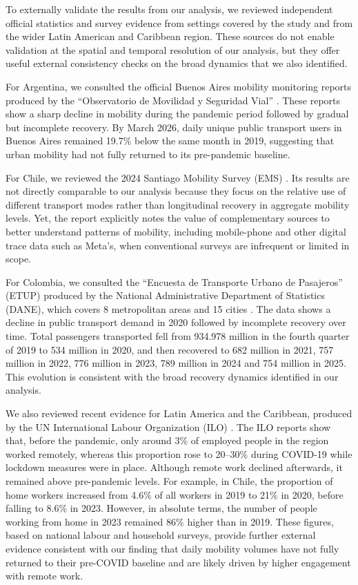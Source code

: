 \documentclass[fleqn,10pt]{wlscirep}
\begin{document}
To externally validate the results from our analysis, we reviewed independent official statistics and survey evidence from settings covered by the study and from the wider Latin American and Caribbean region. These sources do not enable validation at the spatial and temporal resolution of our analysis, but they offer useful external consistency checks on the broad dynamics that we also identified.

For Argentina, we consulted the official Buenos Aires mobility monitoring reports produced by the ``Observatorio de Movilidad y Seguridad Vial'' \cite{OMSV2026BA}. These reports show a sharp decline in mobility during the pandemic period followed by gradual but incomplete recovery. By March 2026, daily unique public transport users in Buenos Aires remained 19.7\% below the same month in 2019, suggesting that urban mobility had not fully returned to its pre-pandemic baseline.

For Chile, we reviewed the 2024 Santiago Mobility Survey (EMS) \cite{Hurtubia2024EMS}. Its results are not directly comparable to our analysis because they focus on the relative use of different transport modes rather than longitudinal recovery in aggregate mobility levels. Yet, the report explicitly notes the value of complementary sources to better understand patterns of mobility, including mobile-phone and other digital trace data such as Meta's, when conventional surveys are infrequent or limited in scope.

For Colombia, we consulted the ``Encuesta de Transporte Urbano de Pasajeros'' (ETUP) produced by the National Administrative Department of Statistics (DANE), which covers 8 metropolitan areas and 15 cities \cite{DANE2025}. The data shows a decline in public transport demand in 2020 followed by incomplete recovery over time. Total passengers transported fell from 934.978 million in the fourth quarter of 2019 to 534 million in 2020, and then recovered to 682 million in 2021, 757 million in 2022, 776 million in 2023, 789 million in 2024 and 754 million in 2025. This evolution is consistent with the broad recovery dynamics identified in our analysis.

We also reviewed recent evidence for Latin America and the Caribbean, produced by the UN International Labour Organization (ILO) \cite{ILO2023PanoramaLaboral, BertranouGontero2024LACWork}. The ILO reports show that, before the pandemic, only around 3\% of employed people in the region worked remotely, whereas this proportion rose to 20--30\% during COVID-19 while lockdown measures were in place. Although remote work declined afterwards, it remained above pre-pandemic levels. For example, in Chile, the proportion of home workers increased from 4.6\% of all workers in 2019 to 21\% in 2020, before falling to 8.6\% in 2023. However, in absolute terms, the number of people working from home in 2023 remained 86\% higher than in 2019. These figures, based on national labour and household surveys, provide further external evidence consistent with our finding that daily mobility volumes have not fully returned to their pre-COVID baseline and are likely driven by higher engagement with remote work.



\end{document}
